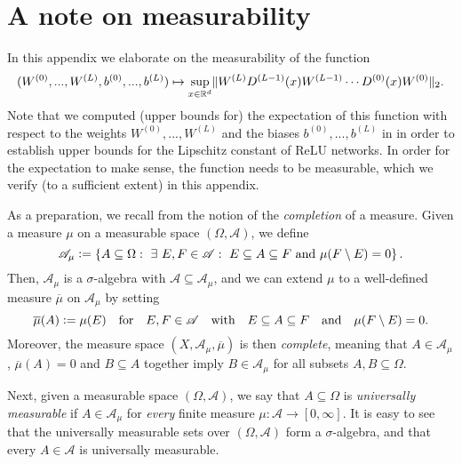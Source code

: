 
\section{A note on measurability} \label{app:measurable}
In this appendix we elaborate on the measurability of the function
\begin{equation} \label{eq:map}
(W^{(0)}, ..., W^{(L)}, b^{(0)}, ..., b^{(L)}) \mapsto \underset{x \in \mathbb{R}^d}{\sup} \Vert W^{(L)}D^{(L-1)}(x)W^{(L-1)} \cdots D^{(0)}(x) W^{(0)}\Vert_2.
\end{equation}
Note that we computed (upper bounds for) the expectation of this function with respect to the weights $W^{(0)}, ..., W^{(L)}$ and the biases $b^{(0)}, ..., b^{(L)}$ in  in order to establish upper bounds for the Lipschitz constant of ReLU networks. In order for the expectation to make sense, the function needs to be measurable, which we verify (to a sufficient extent) in this appendix. 


 
As a preparation, we recall from \cite[Section~1.5]{cohn2013measure} the notion of the \emph{completion} of a measure. 
Given a measure $\mu$ on a measurable space $(\Omega, \mathscr{A})$, we define
\begin{equation*}
\mathscr{A}_\mu \mathrel{\mathop:}= \left\{ A \subseteq \Omega : \ \exists \ E,F \in \mathscr{A}: \ E \subseteq A \subseteq F \text{ and } \mu(F \setminus E) = 0\right\}.
\end{equation*}
Then, $\mathscr{A}_\mu$ is a $\sigma$-algebra with $\mathscr{A} \subseteq \mathscr{A}_\mu$, and we can extend $\mu$ to a well-defined measure $\overline{\mu}$ on $\mathscr{A}_\mu$ by setting
\begin{equation*}
\overline{\mu}(A) \mathrel{\mathop:}= \mu(E) \quad \text{for} \quad E,F \in \mathscr{A} \quad \text{with} \quad E \subseteq A \subseteq F \quad \text{and} \quad \mu(F \setminus E) = 0.
\end{equation*} 
 Moreover, the measure space $(X, \mathscr{A}_\mu, \overline{\mu})$ is then \emph{complete}, meaning that $A \in \mathscr{A}_\mu$, $\overline{\mu}(A)= 0$ and $B \subseteq A$ together imply $B \in \mathscr{A}_\mu$ for all subsets $A,B \subseteq \Omega$.
 
 Next, given a measurable space $(\Omega, \mathscr{A})$, we say that $A \subseteq \Omega$ is \emph{universally measurable} if $A \in \mathscr{A}_\mu$ for \emph{every} finite measure $\mu: \mathscr{A} \to [0, \infty]$. It is easy to see that the universally measurable sets over $(\Omega, \mathscr{A})$ form a $\sigma$-algebra, and that every $A \in \mathscr{A}$ is universally measurable. 
 
